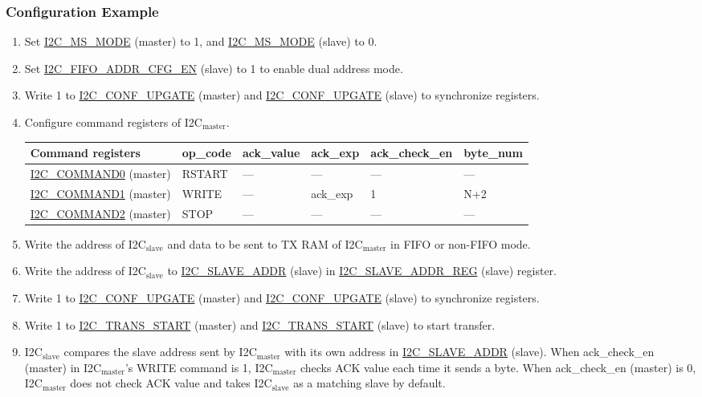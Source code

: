 \documentclass[main\_\_EN.tex]{subfiles}
\begin{document}
\subsubsection{Configuration Example}

\begin{enumerate}
\item Set \hyperref[fielddesc:I2CMSMODE]{I2C\_MS\_MODE} (master) to 1, and \hyperref[fielddesc:I2CMSMODE]{I2C\_MS\_MODE} (slave) to 0.
\item Set \hyperref[fielddesc:I2CFIFOADDRCFGEN]{I2C\_FIFO\_ADDR\_CFG\_EN} (slave) to 1 to enable dual address mode.
\item Write 1 to \hyperref[fielddesc:I2CCONFUPGATE]{I2C\_CONF\_UPGATE} (master) and \hyperref[fielddesc:I2CCONFUPGATE]{I2C\_CONF\_UPGATE} (slave) to synchronize registers.
\item Configure command registers of I2C$_\text{master}$.
\begin{longtable}{ | p{4cm} | p{2cm} | p{2cm} | p{2cm} |p{2.2cm} | p{1.8cm}|}
\hline\rowcolor{lightgray}
Command registers& op\_code & ack\_value&ack\_exp&ack\_check\_en&byte\_num  \\ \hline
\hyperref[fielddesc:I2CCOMMAND0]{I2C\_COMMAND0} (master)& RSTART& ---&---&---&---  \\ \hline
\hyperref[fielddesc:I2CCOMMAND1]{I2C\_COMMAND1} (master)& WRITE& ---&ack\_exp&1&N+2  \\ \hline
\hyperref[fielddesc:I2CCOMMAND2]{I2C\_COMMAND2} (master)& STOP& ---&---&---&---  \\ \hline
\end{longtable}
\item Write the address of I2C$_\text{slave}$ and data to be sent to TX RAM of I2C$_\text{master}$ in FIFO or non-FIFO mode.
\item Write the address of I2C$_\text{slave}$ to \hyperref[fielddesc:I2CSLAVEADDR]{I2C\_SLAVE\_ADDR} (slave) in \hyperref[regdesc:I2CSLAVEADDRREG]{I2C\_SLAVE\_ADDR\_REG} (slave) register.
\item Write 1 to \hyperref[fielddesc:I2CCONFUPGATE]{I2C\_CONF\_UPGATE} (master) and \hyperref[fielddesc:I2CCONFUPGATE]{I2C\_CONF\_UPGATE} (slave) to synchronize registers.
\item Write 1 to \hyperref[fielddesc:I2CTRANSSTART]{I2C\_TRANS\_START} (master) and \hyperref[fielddesc:I2CTRANSSTART]{I2C\_TRANS\_START} (slave) to start transfer.
\item I2C$_\text{slave}$ compares the slave address sent by I2C$_\text{master}$ with its own address in \hyperref[fielddesc:I2CSLAVEADDR]{I2C\_SLAVE\_ADDR} (slave). When ack\_check\_en (master) in I2C$_\text{master}$'s WRITE command is 1, I2C$_\text{master}$ checks ACK value each time it sends a byte. When ack\_check\_en (master) is 0, I2C$_\text{master}$ does not check ACK value and takes I2C$_\text{slave}$ as a matching slave by default.

\end{enumerate}
\end{document}
